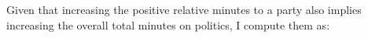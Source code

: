 \documentclass[12pt]{article}
\begin{document}

	
	
	
	
 Given that increasing the positive relative minutes to a party also implies increasing the overall total minutes on politics, I compute them as:
	
\end{document}

